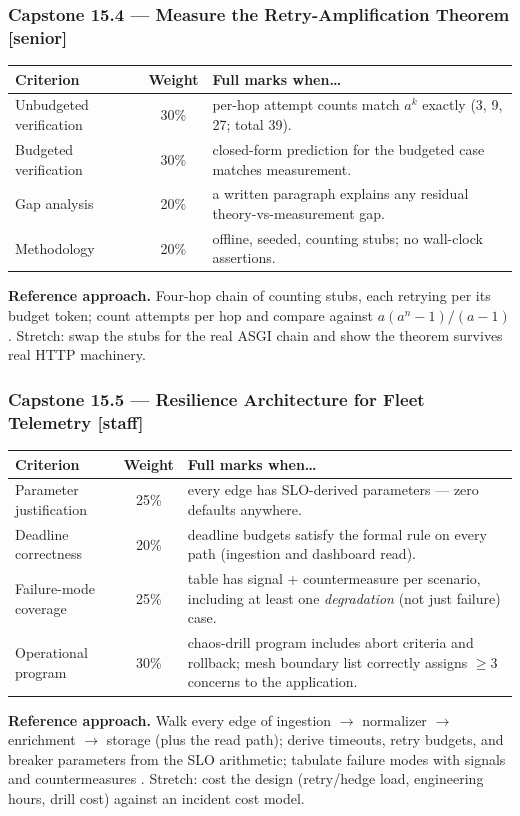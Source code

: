 \subsubsection*{Capstone 15.4 --- Measure the Retry-Amplification Theorem [senior]}
\begin{center}\small
\begin{tabularx}{\textwidth}{l c X}
\toprule
\textbf{Criterion} & \textbf{Weight} & \textbf{Full marks when\ldots} \\
\midrule
Unbudgeted verification & 30\% & per-hop attempt counts match $a^k$ exactly (3, 9, 27; total 39). \\
Budgeted verification & 30\% & closed-form prediction for the budgeted case matches measurement. \\
Gap analysis & 20\% & a written paragraph explains any residual theory-vs-measurement gap. \\
Methodology & 20\% & offline, seeded, counting stubs; no wall-clock assertions. \\
\bottomrule
\end{tabularx}
\end{center}
\textbf{Reference approach.} Four-hop chain of counting stubs, each retrying
per its budget token; count attempts per hop and compare against
$a(a^n - 1)/(a - 1)$. Stretch: swap the stubs for the real ASGI chain and
show the theorem survives real HTTP machinery.

\subsubsection*{Capstone 15.5 --- Resilience Architecture for Fleet Telemetry [staff]}
\begin{center}\small
\begin{tabularx}{\textwidth}{l c X}
\toprule
\textbf{Criterion} & \textbf{Weight} & \textbf{Full marks when\ldots} \\
\midrule
Parameter justification & 25\% & every edge has SLO-derived parameters --- zero defaults anywhere. \\
Deadline correctness & 20\% & deadline budgets satisfy the formal rule on every path (ingestion and dashboard read). \\
Failure-mode coverage & 25\% & table has signal + countermeasure per scenario, including at least one \emph{degradation} (not just failure) case. \\
Operational program & 30\% & chaos-drill program includes abort criteria and rollback; mesh boundary list correctly assigns $\geq$3 concerns to the application. \\
\bottomrule
\end{tabularx}
\end{center}
\textbf{Reference approach.} Walk every edge of ingestion $\to$ normalizer
$\to$ enrichment $\to$ storage (plus the read path); derive timeouts,
retry budgets, and breaker parameters from the SLO arithmetic; tabulate
failure modes with signals and countermeasures \cite{beyer2016sre,
newman2021microservices}. Stretch: cost the design (retry/hedge load,
engineering hours, drill cost) against an incident cost model.

